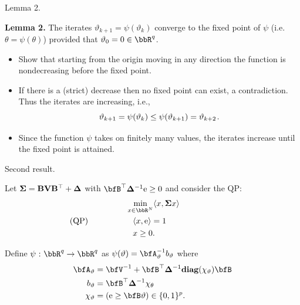 \documentclass[11pt,leqno]{beamer}
\begin{document}
\begin{frame}{Lemma 2.}


{\bf Lemma 2.} The iterates $\vartheta_{k+1}
= \psi(\vartheta_k)$ converge to the fixed point 
of $\psi$ (i.e. $\theta = \psi(\theta)$)
provided that $\vartheta_0 = 0 \in \bbR^q$.


\begin{itemize}
  \item  Show that starting from the origin moving 
in any direction the function is nondecreasing
before the fixed point.
  \item  If there is a (strict) decrease then 
  no fixed point can exist, a contradiction.
  Thus the iterates are increasing, i.e.,
   \[ \vartheta_{k+1} = \psi(\vartheta_k) \le
   \psi (\vartheta_{k+1}) = \vartheta_{k+2} \hspace{1pt} . \]
  \item  Since the function $\psi$ takes on finitely many
values, the iterates increase until the fixed point
is attained.
\end{itemize}

\end{frame}



\begin{frame}{Second result.}


Let $\bm{\Sigma} = \mathbf{B} \mathbf{V} \mathbf{B}^\top + \bm{\Delta}$ with
$\bfB^\top \bdel^{-1} \rme \ge 0$
and consider the QP:
 \begin{align*}  
&\min_{x \in \bbR^{\nv}} \prj{x}{\bsig x}
  \\  \text{(QP)}\hspace{0.64in} &\hspace{8pt} \prj{x}{\rme} = 1  
  \hspace{1.16in}
  \\ &\hspace{8pt} x \ge  0 .
\end{align*}

Define $\psi \cst \bbR^q \to \bbR^q$ as 
$\psi (\vartheta) = \bfA^{-1}_\vartheta b_\vartheta$ where
\begin{equation}
\begin{aligned}
  \bfA_\vartheta &= \bfV^{-1} + \bfB^\top \bdel^{-1}
  \textbf{diag}(\chi_\vartheta) \bfB \\
  b_\vartheta &= \bfB^\top \bdel^{-1} \chi_\theta \\
  \chi_\vartheta &= (\rme \ge \bfB \vartheta)   
  \in \{0,1\}^p .
\end{aligned}
\end{equation}




\end{frame}
\end{document}
